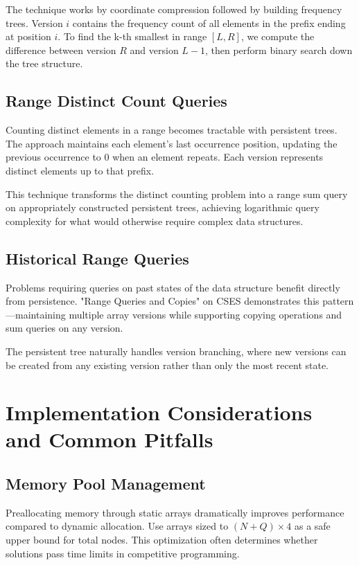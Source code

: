 The technique works by coordinate compression followed by building frequency trees. Version $i$ contains the frequency count of all elements in the prefix ending at position $i$. To find the k-th smallest in range $[L,R]$, we compute the difference between version $R$ and version $L-1$, then perform binary search down the tree structure.


\subsection{Range Distinct Count Queries}

Counting distinct elements in a range becomes tractable with persistent trees. The approach maintains each element's last occurrence position, updating the previous occurrence to 0 when an element repeats. Each version represents distinct elements up to that prefix.

This technique transforms the distinct counting problem into a range sum query on appropriately constructed persistent trees, achieving logarithmic query complexity for what would otherwise require complex data structures.

\subsection{Historical Range Queries}
Problems requiring queries on past states of the data structure benefit directly from persistence. "Range Queries and Copies" on CSES demonstrates this pattern—maintaining multiple array versions while supporting copying operations and sum queries on any version.

The persistent tree naturally handles version branching, where new versions can be created from any existing version rather than only the most recent state.

\section{Implementation Considerations and Common Pitfalls}
\label{sec:implementation_considerations}

\subsection{Memory Pool Management}

Preallocating memory through static arrays dramatically improves performance compared to dynamic allocation. Use arrays sized to $(N + Q) \times 4$ as a safe upper bound for total nodes. This optimization often determines whether solutions pass time limits in competitive programming.

